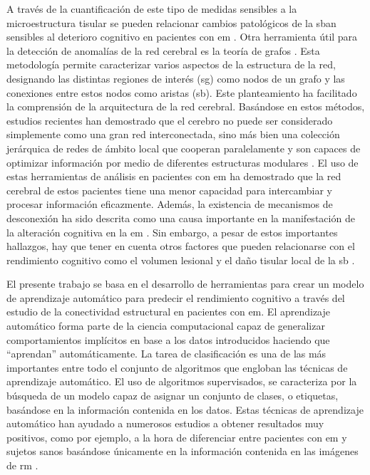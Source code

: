 A través de la cuantificación de este tipo de medidas sensibles a la microestructura tisular se pueden relacionar cambios patológicos de la \gls{sban} sensibles al deterioro cognitivo en pacientes con \gls{em} \cite{Gabilondo2014Trans-synapticSclerosis} \cite{Llufriu2017StructuralSclerosis}. Otra herramienta útil para la detección de anomalías de la red cerebral es la teoría de grafos \cite{Bullmore2009ComplexSystems}. Esta metodología permite caracterizar varios aspectos de la estructura de la red, designando las distintas regiones de interés (\gls{sg}) como nodos de un grafo y las conexiones entre estos nodos como aristas (\gls{sb}). Este planteamiento ha facilitado la comprensión de la arquitectura de la red cerebral. Basándose en estos métodos, estudios recientes han demostrado que el cerebro no puede ser considerado simplemente como una gran red interconectada, sino más bien una colección jerárquica de redes de ámbito local que cooperan paralelamente y son capaces de optimizar información por medio de diferentes estructuras modulares \cite{Sporns2011NetworksBrain}. El uso de estas herramientas de análisis en pacientes con \gls{em} ha demostrado que la red cerebral de estos pacientes tiene una menor capacidad para intercambiar y procesar información eficazmente. Además, la existencia de mecanismos de desconexión ha sido descrita como una causa importante en la manifestación de la alteración cognitiva en la \gls{em} \cite{Shu2011DiffusionSclerosis} \cite{Llufriu2017StructuralSclerosis} \cite{Bozzali2013AnatomicalSclerosis} \cite{Louapre2014BrainStudy} \cite{Dineen2009DisconnectionSclerosis}. Sin embargo, a pesar de estos importantes hallazgos, hay que tener en cuenta otros factores que pueden relacionarse con el rendimiento cognitivo como el volumen lesional y el daño tisular local de la \gls{sb} \cite{Stellmann2017ReducedMS} \cite{Ouellette2018LesionSclerosis.}. 

El presente trabajo se basa en el desarrollo de herramientas para crear un modelo de aprendizaje automático para predecir el rendimiento cognitivo a través del estudio de la conectividad estructural en  pacientes con \gls{em}. El aprendizaje automático forma parte de la ciencia computacional capaz de generalizar comportamientos implícitos en base a los datos introducidos haciendo que ``aprendan'' automáticamente. La tarea de clasificación es una de las más importantes entre todo el conjunto de algoritmos que engloban las técnicas de aprendizaje automático. El uso de algoritmos supervisados, se caracteriza por la búsqueda de un modelo capaz de asignar un conjunto de clases, o etiquetas, basándose en la información contenida en los datos. Estas técnicas de aprendizaje automático han ayudado a numerosos estudios a obtener resultados muy positivos, como por ejemplo, a la hora de diferenciar entre pacientes con \gls{em} y sujetos sanos basándose únicamente en la información contenida en las imágenes de \gls{rm} \cite{Zhang2016ComparisonMachine}.